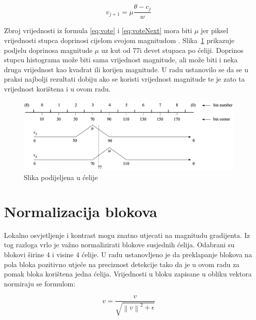 \documentclass[times, utf8, zavrsni]{fer}
\begin{document}
 \begin{equation}
 	v_{j+1} = \mu \frac{\theta - c_j}{w}
 	\label{eq:voteNext}
\end{equation}

Zbroj vrijednosti iz formula \ref{eq:vote} i \ref{eq:voteNext} mora biti \(\mu\) jer piksel vrijednosti stupca doprinosi cijelom svojom magnitudom \citep{tomasi2012histograms}. Slika~\ref{fig:vote} prikazuje podjelu doprinosa magnitude \(\mu \) uz kut od 77\degree i devet stupaca po ćeliji. Doprinos stupcu histograma može biti sama vrijednost magnitude, ali može biti i neka druga vrijednost kao kvadrat ili korijen magnitude. U radu \cite{dalal2005histograms} ustanovilo se da se u praksi najbolji rezultati dobiju ako se koristi vrijednost magnitude te je zato ta vrijednost korištena i u ovom radu.

\begin{figure}[htb]
	\centering
	\includegraphics[width=\linewidth]{figures/vote.png}
	\caption{Slika podijeljena u ćelije\protect\footnotemark}
	\label{fig:vote}
\end{figure}


\section{Normalizacija blokova}
Lokalno osvjetljenje i kontrast mogu znatno utjecati na magnitudu gradijenta. Iz tog razloga vrlo je važno normalizirati blokove susjednih ćelija. Odabrani su blokovi širine 4 i visine 4 ćelije. U radu \cite{dalal2005histograms} ustanovljeno je da preklapanje blokova na pola bloka pozitivno utječe na preciznost detekcije tako da je u ovom radu za pomak bloka korištena jedna ćelija. Vrijednosti u bloku zapisane u obliku vektora normiraju se formulom:

\begin{equation}
	v = \frac{v}{\sqrt{\left\|v\right\|^2 + \epsilon}}
	\label{eq:norm}
\end{equation}
\end{document}
